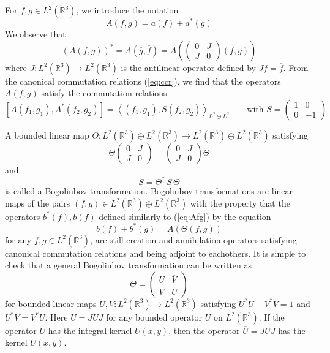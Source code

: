 \documentclass[11pt,a4paper,DIV11]{scrartcl}	%
\newcommand{\bR}{{\mathbb R}}
\begin{document}
For $f,g \in L^2 (\bR^3)$, we introduce the notation
\begin{equation}\label{eq:Afg} A(f,g) = a(f) + a^* (\overline{g}) \end{equation}
We observe that 
\begin{equation}\label{eq:bog11} 
(A(f,g))^* = A(\overline{g}, \overline{f}) = A \left( \left( \begin{array}{ll} 0 & J \\ J & 0 \end{array} \right) (f,g) \right)\end{equation}
where $J:L^2 (\bR^3) \to L^2 (\bR^3)$ is the antilinear operator defined by $Jf = \overline{f}$. {F}rom the canonical commutation relations (\ref{eq:ccr}), we find that the operators $A(f,g)$ satisfy the commutation relations
\begin{equation}\label{eq:bog22} \left[ A(f_1, g_1) , A^* (f_2, g_2) \right] = \left\langle (f_1, g_1) , S (f_2, g_2) \right\rangle_{L^2 \oplus L^2} \qquad \text{with } S = \left( \begin{array}{ll} 1 & 0 \\ 0 & -1 \end{array} \right) \end{equation}

A bounded linear map $\Theta : L^2 (\bR^3) \oplus L^2 (\bR^3) \to L^2 (\bR^3) \oplus L^2 (\bR^3)$ satisfying
\begin{equation}\label{eq:bog1}
\Theta \left( \begin{array}{ll} 0 & J \\ J & 0 \end{array} \right) = \left( \begin{array}{ll} 0 & J \\ J & 0 \end{array} \right) \Theta \end{equation}
and
\begin{equation}\label{eq:bog2} S = \Theta^* \, S \, \Theta \end{equation}
is called a Bogoliubov transformation. Bogoliubov transformations are linear maps of the pairs $(f,g) \in L^2 (\bR^3) \oplus L^2 (\bR^3)$ with the property that the operators $b^* (f), b(f)$ defined similarly to (\ref{eq:Afg}) by the equation \[ b (f) + b^* (\overline{g}) = A (\Theta (f,g)) \] for any $f,g \in L^2 (\bR^3)$, are still creation and annihilation operators satisfying canonical commutation relations and being adjoint to eachothers. It is simple to check that a general Bogoliubov transformation can be written as  
\begin{equation}\label{eq:theta-UV} \Theta = \left( \begin{array}{ll} U &  \overline{V}  \\ V & \overline{U} \end{array} \right) \end{equation}
for bounded linear maps $U, V: L^2 (\bR^3) \to L^2 (\bR^3)$ satisfying $U^* U - V^* V = 1$ and $U^* \overline{V} = V^*\overline{U}$. Here $\overline{U} = J U J$ for any bounded operator $U$ on $L^2 (\bR^3)$. If the operator $U$ has the integral kernel $U(x,y)$, then the operator $\overline{U} = J U J$ has the kernel $\overline{U(x,y)}$. 
\end{document}
